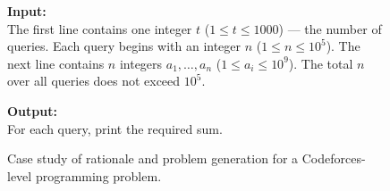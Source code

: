 \begin{figure}[htb]
{\begin{minipage}{0.99\textwidth}
              \vspace{0.5em}
              \textbf{Input:} \\
              The first line contains one integer $t$ ($1 \leq t \leq 1000$) — the number of queries. Each query begins with an integer $n$ ($1 \leq n \leq 10^5$). The next line contains $n$ integers $a_1,\dots,a_n$ ($1 \leq a_i \leq 10^9$). The total $n$ over all queries does not exceed $10^5$.
  
              \vspace{0.5em}
              \textbf{Output:} \\
              For each query, print the required sum.
  
          \end{minipage}%
      }
      \caption{Case study of rationale and problem generation for a Codeforces-level programming problem.}
      \label{fig:case_study_rationale3}
  \end{figure}
  
  
  